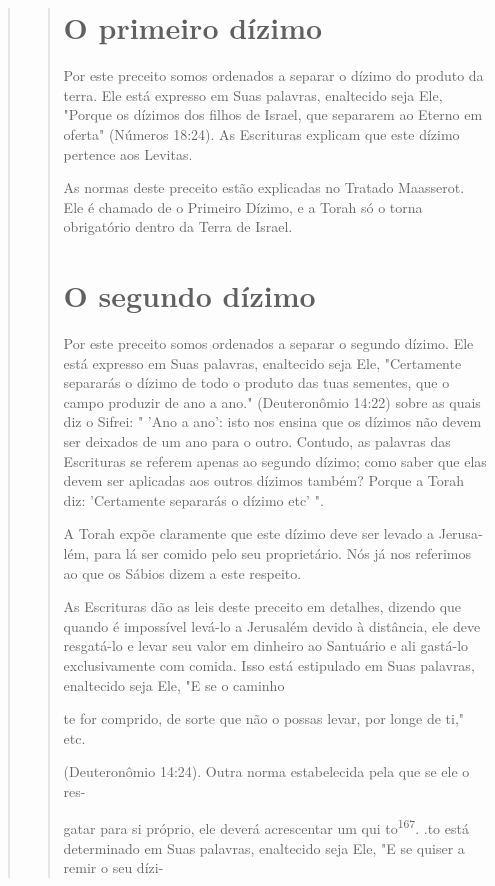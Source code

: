 \begin{quote}
\begin{quote}
\section{O primeiro dízimo}

Por este preceito somos ordenados a separar o dízimo do produto da
terra. Ele está expresso em Suas palavras, enaltecido seja Ele, "Porque
os dízimos dos filhos de Israel, que separarem ao Eterno em oferta"
(Números 18:24). As Escrituras explicam que este dízimo pertence aos
Levitas.

As normas deste preceito estão explicadas no Tratado Maasserot. Ele é
chamado de o Primeiro Dízimo, e a Torah só o torna obrigatório dentro da
Terra de Israel.

\section{O segundo dízimo}

Por este preceito somos ordenados a separar o segundo dízimo. Ele está
expresso em Suas palavras, enaltecido seja Ele, "Certamente separarás o
dízimo de todo o produto das tuas sementes, que o campo produzir de ano
a ano." (Deuteronômio 14:22) sobre as quais diz o Sifrei: " 'Ano a ano':
isto nos ensina que os dízimos não devem ser deixados de um ano para o
outro. Contudo, as palavras das Escrituras se referem apenas ao segundo
dízimo; co­mo saber que elas devem ser aplicadas aos outros dízimos
também? Porque a Torah diz: 'Certamente separarás o dízimo etc' ".

A Torah expõe claramente que este dízimo deve ser levado a Jerusa­lém,
para lá ser comido pelo seu proprietário. Nós já nos referimos ao que os
Sábios dizem a este respeito.

As Escrituras dão as leis deste preceito em detalhes, dizendo que
quan­do é impossível levá-lo a Jerusalém devido à distância, ele deve
resgatá-lo e le­var seu valor em dinheiro ao Santuário e ali gastá-lo
exclusivamente com comi­da. Isso está estipulado em Suas palavras,
enaltecido seja Ele, "E se o caminho

te for comprido, de sorte que não o possas levar, por longe de ti," etc.

(Deuteronômio 14:24). Outra norma estabelecida pela que se ele o res-

gatar para si próprio, ele deverá acrescentar um qui
to\textsuperscript{167}. .to está determinado
em Suas palavras, enaltecido seja Ele, "E se quiser a remir o seu
dízi-
\end{quote}


\end{quote}
